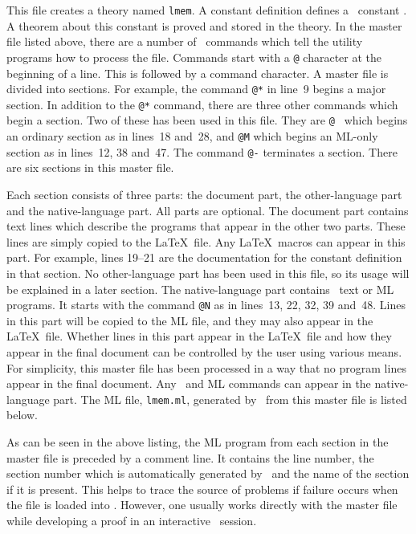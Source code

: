 
This file creates a theory named {\tt lmem}. A
constant definition defines a \HOL\ constant . A theorem
about this constant is proved and stored in the theory. In the master
file listed above, there are a number of \mweb\ commands which tell
the utility programs how to process the file. Commands start with a
\verb|@| character at the beginning of a line. This is followed by a
command character. A master file is divided into sections. For
example, the command \verb|@*| in line~9 begins 
a major section. In addition to the \verb|@*|
command, there are three other commands which begin a section. Two of
these has been used in this file. They are \verb*|@ | which begins an
ordinary section as in lines~18 and~28, and \verb|@M| which begins an
ML-only section as in lines~12, 38 and~47. The command \verb|@-|
terminates a section. There are six sections in this master file.

Each section consists of three parts: the document part, the
other-language part and the native-language part. All parts are
optional. The document part
contains text lines which describe the programs that appear in the other
two parts. These lines are simply copied to the \LaTeX\ file. Any
\LaTeX\ macros can appear in this part. For example, lines 19--21 are
the documentation for the constant definition in that section. No
other-language part has been used in this file, so its usage will be
explained in a later section. The native-language part contains \HOL\
text or ML programs. It starts with the command \verb|@N| as in
lines~13, 22, 32, 39 and~48. Lines in this part will be copied to the
ML file, and they may also appear in the \LaTeX\ file. Whether lines
in this part appear in the \LaTeX\ file and how they appear in the
final document can be controlled by the user using
various means. For simplicity, this master file has been processed in
a way that no program lines appear in the final document. Any
\HOL\ and ML commands can appear in the native-language part. 
The ML file, {\tt lmem.ml}, generated by \tangle\ from this master file
is listed below.
\newpage
{}

As can be seen in the above listing, the ML program  from each section in
the master file is preceded by a comment line. It contains the line
number, the section number which is automatically generated by
\tangle\ and the name of the section if it is present. This helps to
trace the source of problems if failure occurs when the file is loaded
into \HOL. However, one usually works directly with the master file
while developing a proof in an interactive \HOL\ session.

